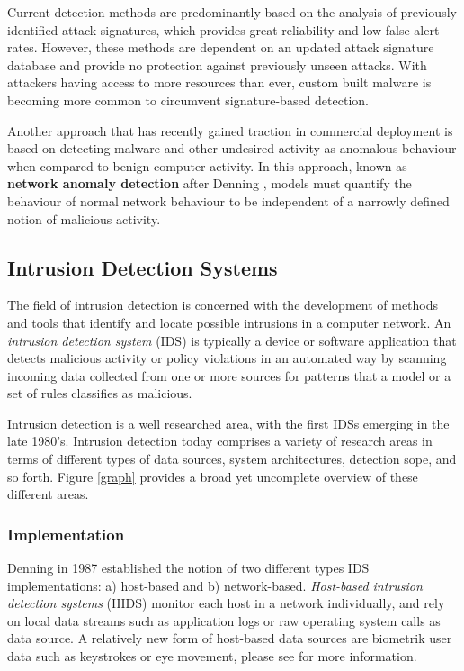 Current detection methods are predominantly based on the analysis of previously identified attack signatures, which provides great reliability and low false alert rates. However, these methods are dependent on an updated attack signature database and provide no protection against previously unseen attacks. With attackers having access to more resources than ever, custom built malware is becoming more common to circumvent signature-based detection. 

Another approach that has recently gained traction in commercial deployment is based on detecting malware and other undesired activity as anomalous behaviour when compared to benign computer activity. In this approach, known as \textbf{network anomaly detection} after Denning \cite{denning1987intrusion}, models must quantify the behaviour of normal network behaviour to be independent of a narrowly defined notion of malicious activity.

\subsection{Intrusion Detection Systems}

The field of intrusion detection is concerned with the development of methods and tools that identify and locate possible intrusions in a computer network. An \textit{intrusion detection system} (IDS) is typically a device or software application that detects malicious activity or policy violations in an automated way by scanning incoming data collected from one or more sources for patterns that a model or a set of rules classifies as malicious.

Intrusion detection is a well researched area, with the first IDSs emerging in the late 1980's. Intrusion detection today comprises a variety of research areas in terms of different types of data sources, system architectures, detection sope, and so forth. Figure \ref{graph} provides a broad yet uncomplete overview of these different areas. 

\subsubsection*{Implementation}

Denning \cite{denning1987intrusion} in 1987 established the notion of two different types IDS implementations: a) host-based and b) network-based. 
\textit{Host-based intrusion detection systems} (HIDS) monitor each host in a network individually, and rely on local data streams such as application logs or raw operating system calls as  data source. A relatively new form of host-based data sources are biometrik user data such as keystrokes or eye movement, please see \cite{peng_user_2016} for more information.

